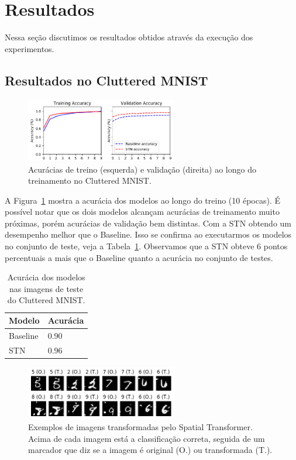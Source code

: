 \documentclass[conference]{IEEEtran}
\begin{document}
\section{Resultados}

Nessa seção discutimos os resultados obtidos através da execução dos experimentos.

\subsection{Resultados no Cluttered MNIST}

\begin{figure}[ht!]
  \centering
  \includegraphics[width=250px]{img/CM-training-accs.png}
  \caption{Acurácias de treino (esquerda) e validação (direita) ao longo do treinamento no Cluttered MNIST.}
  \label{fig:cm-training-accs}
\end{figure}

A Figura~\ref{fig:cm-training-accs} mostra a acurácia dos modelos ao longo do treino (10 épocas). É possível notar que os dois modelos alcançam acurácias de treinamento muito próximas, porém acurácias de validação bem distintas. Com a STN obtendo um desempenho melhor que o Baseline. Isso se confirma ao executarmos os modelos no conjunto de teste, veja a Tabela~\ref{tab:cm-teste-accs}. Observamos que a STN obteve 6 pontos percentuais a mais que o Baseline quanto a acurácia no conjunto de testes.

\begin{table}[!ht]
  \begin{center}
    \begin{tabular}{|l|l|}
      \hline
      \textbf{Modelo} & \textbf{Acurácia} \\ \hline
      Baseline        & 0.90              \\ \hline
      STN             & 0.96              \\ \hline
    \end{tabular}
  \end{center}
  \caption{Acurácia dos modelos nas imagens de teste do Cluttered MNIST.}
  \label{tab:cm-teste-accs}
\end{table}

\begin{figure}[ht!]
  \centering
  \includegraphics[width=250px]{img/CM-through-st.png}
  \caption{Exemplos de imagens transformadas pelo Spatial Transformer. Acima de cada imagem está a classificação correta, seguida de um marcador que diz se a imagem é original (O.) ou transformada (T.).}
  \label{fig:cm-through-st}
\end{figure}
\end{document}
